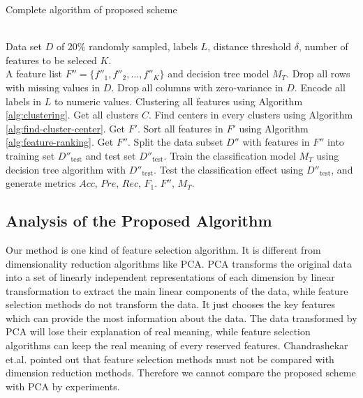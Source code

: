 \documentclass{ieeeaccess}
\theoremstyle{definition}
\begin{document}
\begin{algorithm}
    \caption{Complete algorithm of proposed scheme}
    \label{alg:complete-algorithm}
    \begin{algorithmic}[1]
        \REQUIRE ~~\\
            Data set $D$ of 20\% randomly sampled, labels $L$, distance threshold $\delta$, number of features to be seleced $K$.
        \ENSURE ~~\\
            A feature list $F''=\{f''_1, f''_2, \ldots, f''_K\}$ and decision tree model $M_T$. 
        \STATE Drop all rows with missing values in $D$.
        \STATE Drop all columns with zero-variance in $D$.
        \STATE Encode all labels in $L$ to numeric values.
        \STATE Clustering all features using Algorithm \ref{alg:clustering}. Get all clusters $C$.
        \STATE Find centers in every clusters using Algorithm \ref{alg:find-cluster-center}. Get $F'$.
        \STATE Sort all features in $F'$ using Algorithm \ref{alg:feature-ranking}. Get $F''$.
        \STATE Split the data subset $D''$ with features in $F''$ into training set $D''_{\text{test}}$ and test set $D''_{\text{test}}$.
        \STATE Train the classification model $M_T$ using decision tree algorithm with $D''_{\text{test}}$.
        \STATE Test the classification effect using $D''_{\text{test}}$, and generate metrics $Acc$, $Pre$, $Rec$, $F_1$.
        \RETURN $F''$, $M_T$.
    \end{algorithmic}
\end{algorithm}

\subsection{Analysis of the Proposed Algorithm}

Our method is one kind of feature selection algorithm. It is different from dimensionality reduction algorithms like PCA\cite{PCA1987}. PCA transforms the original data into a set of linearly independent representations of each dimension by linear transformation to extract the main linear components of the data, while feature selection methods do not transform the data. It just chooses the key features which can provide the most information about the data. The data transformed by PCA will lose their explanation of real meaning, while feature selection algorithms can keep the real meaning of every reserved features. Chandrashekar et.al. \cite{Chandrashekar2014} pointed out that feature selection methods must not be compared with dimension reduction methods. Therefore we cannot compare the proposed scheme with PCA by experiments. 
\end{document}
